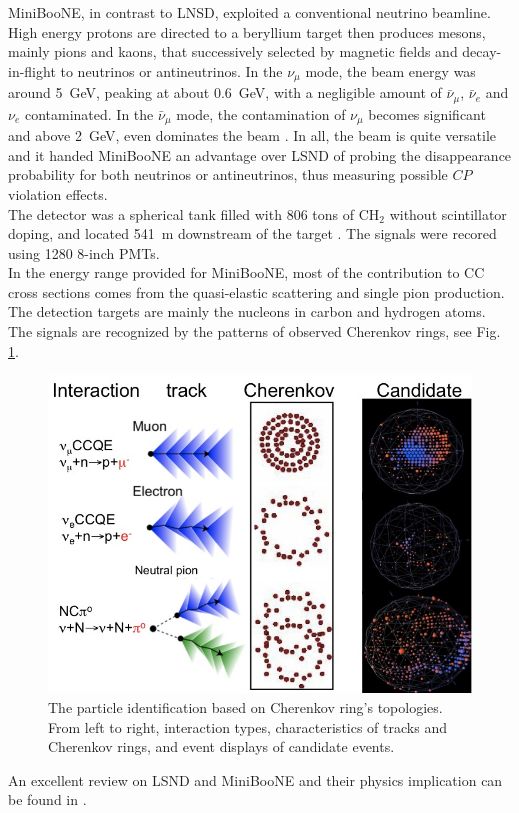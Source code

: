MiniBooNE, in contrast to LNSD, exploited a conventional neutrino beamline. High energy protons are directed to a beryllium target then produces mesons, mainly pions and kaons, that successively selected by magnetic fields and decay-in-flight to neutrinos or antineutrinos. In the $ \nu_\mu $ mode, the beam energy was around 5~GeV, peaking at about 0.6~GeV, with a negligible amount of $\bar{\nu}_\mu $, $ \bar{\nu}_e $ and $ \nu_e $ contaminated. In the $ \bar{\nu}_\mu $ mode, the contamination of $ \nu_\mu $ becomes significant and above 2~GeV, even dominates the beam \cite{AguilarArevalo200928}. In all, the beam is quite versatile and it handed MiniBooNE an advantage over LSND of probing the disappearance probability for both neutrinos or antineutrinos, thus measuring possible $ CP $ violation effects.\\

The detector was a spherical tank filled with 806 tons of $\text{C}\text{H}_2 $ without scintillator doping, and located 541~m downstream of the target \cite{AguilarArevalo200928}. The signals were recored using 1280 8-inch PMTs.\\

In the energy range provided for MiniBooNE, most of the contribution to CC cross sections comes from the quasi-elastic scattering and single pion production. The detection targets are mainly the nucleons in carbon and hydrogen atoms. The signals are recognized by the patterns of observed Cherenkov rings, see Fig. \ref{fig:mbtopology}. \\

\begin{figure}[h!]
	\begin{center}
		\includegraphics[scale=0.3]{MB_topology}
		\caption{The particle identification based on Cherenkov ring's topologies. From left to right, interaction types, characteristics of tracks and Cherenkov rings, and event displays of candidate events.}
	\end{center}
	\label{fig:mbtopology}
\end{figure}

An excellent review on LSND and MiniBooNE and their physics implication can be found in \cite{annurev-nucl-102711-094957}.





